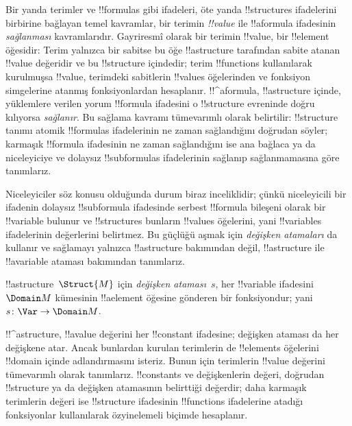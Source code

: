 



\begin{explain}
Bir yanda terimler ve !!{formula}s gibi ifadeleri, öte yanda
!!{structure}s ifadelerini birbirine bağlayan temel kavramlar, bir
terimin \emph{!!{value}} ile !!a{formula} ifadesinin \emph{sağlanması}
kavramlarıdır. Gayriresmî olarak bir terimin !!{value}, bir !!{element}
öğesidir: Terim yalnızca bir sabitse bu öğe !!a{structure} tarafından
sabite atanan !!{value} değeridir ve bu !!{structure} içindedir; terim
!!{function}s
kullanılarak kurulmuşsa !!{value}, terimdeki sabitlerin !!{value}s
öğelerinden ve fonksiyon simgelerine atanmış fonksiyonlardan hesaplanır.
!!^a{formula}, !!a{structure} içinde, yüklemlere verilen yorum
!!{formula} ifadesini o !!{structure} evreninde doğru kılıyorsa
\emph{sağlanır}. Bu sağlama kavramı tümevarımlı olarak belirtilir:
!!{structure} tanımı atomik !!{formula}s ifadelerinin ne zaman
sağlandığını doğrudan söyler; karmaşık !!{formula} ifadesinin ne zaman
sağlandığını ise ana bağlaca ya da niceleyiciye ve dolaysız
!!{subformula}s ifadelerinin sağlanıp sağlanmamasına göre tanımlarız.

Niceleyiciler söz konusu olduğunda durum biraz inceliklidir; çünkü
niceleyicili bir ifadenin dolaysız !!{subformula} ifadesinde serbest
!!{formula} bileşeni olarak bir !!{variable} bulunur ve !!{structure}s
bunların !!{value}s öğelerini, yani !!{variable}s ifadelerinin
değerlerini belirtmez. Bu güçlüğü aşmak için
\emph{değişken atamaları} da kullanır ve sağlamayı yalnızca
!!a{structure} bakımından değil, !!a{structure} ile !!a{variable}
ataması bakımından tanımlarız.
\end{explain}

\begin{defn}
!!a{structure}~$\Struct{M}$ için \emph{değişken ataması}~$s$, her
!!{variable} ifadesini~$\Domain M$ kümesinin !!a{element} öğesine
gönderen bir fonksiyondur; yani $s\colon \Var \to \Domain M$.
\end{defn}

\begin{explain}
!!^a{structure}, !!a{value} değerini her !!{constant} ifadesine;
değişken ataması da her değişkene atar. Ancak bunlardan kurulan
terimlerin de !!{element}s öğelerini !!{domain} içinde adlandırmasını isteriz.
Bunun için terimlerin !!{value} değerini tümevarımlı olarak tanımlarız.
!!{constant}s ve değişkenlerin değeri, doğrudan !!{structure} ya da
değişken atamasının belirttiği değerdir; daha karmaşık terimlerin değeri
ise !!{structure} ifadesinin !!{function}s ifadelerine atadığı
fonksiyonlar kullanılarak özyinelemeli biçimde hesaplanır.
\end{explain}

